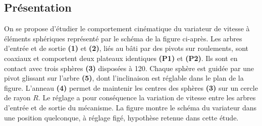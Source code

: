 \documentclass[10pt,fleqn]{article} %
\begin{document}
\def\pathfig{images}

\vspace{4.5cm}
\pagestyle{fancy}
\thispagestyle{plain}

\def\columnseprulecolor{\color{ocre}}
\setlength{\columnseprule}{0.4pt} 

\def\pathfig{images}

\ifprof
\else
\begin{multicols}{2}
\fi


\subsection*{Présentation}
\setcounter{subparagraph}{0}


On se propose d’étudier le comportement cinématique du variateur de vitesse à éléments sphériques représenté par le schéma de la figure ci-après.
Les arbres d’entrée et de sortie \textbf{(1)} et  \textbf{(2)}, liés au bâti par des pivots sur roulements, sont coaxiaux et comportent deux plateaux identiques  \textbf{(P1)} et \textbf{(P2)}. Ils sont en contact avec trois sphères  \textbf{(3)} disposées à 120\degres. Chaque sphère est guidée par une pivot glissant sur l’arbre  \textbf{(5)}, dont l’inclinaison est réglable dans le plan de la figure.
L’anneau  \textbf{(4)} permet de maintenir les centres des sphères  \textbf{(3)} sur un cercle de rayon $R$.
Le réglage a pour conséquence la variation de vitesse entre les arbres d’entrée et de sortie du mécanisme.
La figure montre le schéma du variateur dans une position quelconque, à réglage figé, hypothèse retenue dans cette étude.



\end{multicols}
\end{document}
